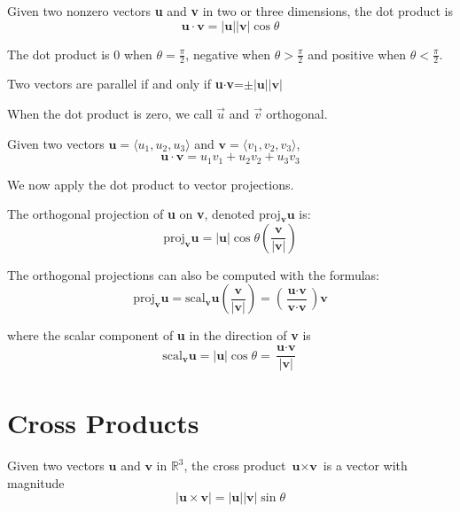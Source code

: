\documentclass[../calc3.tex]{subfiles}
\begin{document}
\begin{definition}
    Given two nonzero vectors \textbf{u} and \textbf{v} in two or three dimensions, the dot product is
    \[\textbf{u}\cdot\textbf{v}=|\textbf{u}||\textbf{v}|\cos \theta\]
\end{definition}

The dot product is 0 when $\theta=\frac{\pi}{2}$, negative when $\theta>\frac{\pi}{2}$ and positive when $\theta<\frac{\pi}{2}$.

Two vectors are parallel if and only if \textbf{u}$\cdot$\textbf{v}=$\pm|\textbf{u}||\textbf{v}|$ 

When the dot product is zero, we call $\vec{u}$ and $\vec{v}$ orthogonal.
\begin{theorem}
    Given two vectors $\textbf{u}=\langle u_1, u_2, u_3 \rangle$ and $\textbf{v}=\langle v_1, v_2, v_3 \rangle$,
    \[\textbf{u}\cdot\textbf{v}=u_1v_1+u_2v_2+u_3v_3\]
\end{theorem}

We now apply the dot product to vector projections.
\begin{definition}
    The orthogonal projection of \textbf{u} on \textbf{v}, denoted proj$_{\textbf{v}}\textbf{u}$ is:
    \[\text{proj}_{\textbf{v}}\textbf{u}=|\textbf{u}|\cos\theta\left(\frac{\textbf{v}}{|\textbf{v}|}\right)\]

    The orthogonal projections can also be computed with the formulas:
    \[\text{proj}_{\textbf{v}}\textbf{u}=\text{scal}_{\textbf{v}}\textbf{u}\left(\frac{\textbf{v}}{|\textbf{v}|}\right)=
    \left(\frac{\textbf{u}\cdot\textbf{v}}{\textbf{v}\cdot\textbf{v}}\right)\textbf{v}\]
    
    where the scalar component of \textbf{u} in the direction of \textbf{v} is 
    \[\text{scal}_{\textbf{v}}\textbf{u}=|\textbf{u}|\cos\theta = \frac{\textbf{u}\cdot\textbf{v}}{|\textbf{v}|}\]
\end{definition}



\section{Cross Products}
\begin{definition}
    Given two vectors $\textbf{u}$ and $\textbf{v}$ in $\mathbb{R}^3$, the cross product $\textbf{u}\times\textbf{v}$ 
    is a vector with magnitude
        \[|\textbf{u}\times\textbf{v}|=|\textbf{u}||\textbf{v}|\sin\theta\]
\end{definition}
\end{document}
